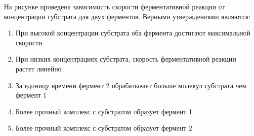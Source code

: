 
На рисунке приведена
зависимость скорости ферментативной реакции от концентрации субстрата для двух
ферментов. Верными утверждениями являются:


\begin{enumerate}
    \item При высокой концентрации субстрата оба фермента достигают максимальной скорости
    \item При низких концентрациях субстрата, скорость ферментативной реакции растет линейно
    \item За единицу времени фермент 2 обрабатывает больше молекул субстрата чем фермент 1
    \item Более прочный комплекс с субстратом образует фермент 1
    \item Более прочный комплекс с субстратом образует фермент 2
\end{enumerate}

\explanationSection

